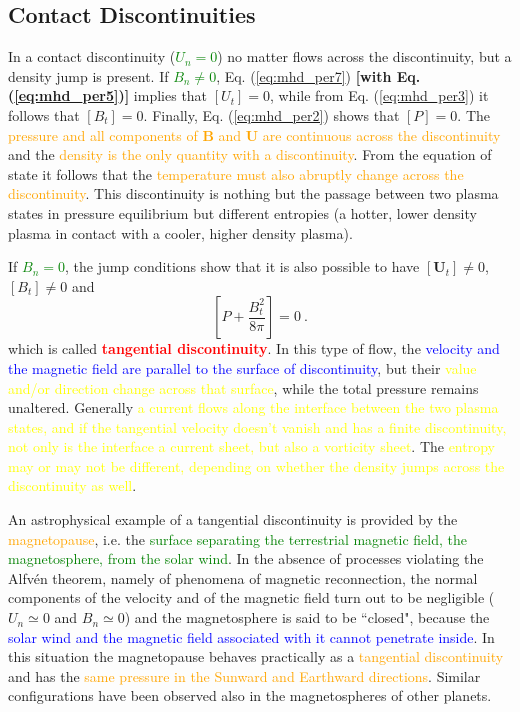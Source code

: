 \documentclass[12pt,a4paper]{article}
\renewcommand{\vec}[1]{\boldsymbol{#1}}
\begin{document}
\subsection{Contact Discontinuities}
\cite{2015bps..book.....C} In a contact discontinuity (\textcolor{green}{$U_n = 0$}) no matter flows across the discontinuity, but a density jump is present. If \textcolor{green}{$B_n \neq 0$}, Eq. (\ref{eq:mhd_per7}) {\bf[with Eq. (\ref{eq:mhd_per5})]} implies that $[U_t] = 0$, while from Eq. (\ref{eq:mhd_per3}) it follows that $[B_t] = 0$. Finally, Eq. (\ref{eq:mhd_per2}) shows that $[P] = 0$. The \textcolor{orange}{pressure and all components of $\vec{B}$ and $\vec{U}$ are continuous across the discontinuity} and the \textcolor{orange}{density is the only quantity with a discontinuity}. From the equation of state it follows that the \textcolor{orange}{temperature must also abruptly change across the discontinuity}. This discontinuity is nothing but the passage between two plasma states in pressure equilibrium but different entropies (a hotter, lower density plasma in contact with a cooler, higher density plasma). 

If \textcolor{green}{$B_n = 0$}, the jump conditions show that it is also possible to have $[\vec{U}_t] \neq 0$, $[B_t] \neq 0$ and
\begin{equation*}
\left[P +\frac{B_t^2}{8\pi} \right] = 0 ~.
\end{equation*}
which is called \textcolor{red}{\bf tangential discontinuity}. In this type of flow, the \textcolor{blue}{velocity and the magnetic field are parallel to the surface of discontinuity}, but their \textcolor{yellow}{value and/or direction change across that surface}, while the total pressure remains unaltered. Generally \textcolor{yellow}{a current flows along the interface between the two plasma states, and if the tangential velocity doesn't vanish and has a finite discontinuity, not only is the interface a current sheet, but also a vorticity sheet}. The \textcolor{yellow}{entropy may or may not be different, depending on whether the density jumps across the discontinuity as well}.

An astrophysical example of a tangential discontinuity is provided by the \textcolor{orange}{magnetopause}, i.e. the \textcolor{green}{surface separating the terrestrial magnetic field, the magnetosphere, from the solar wind}. In the absence of processes violating the Alfv\'en theorem, namely of phenomena of magnetic reconnection, the normal components of the velocity and of the magnetic field turn out to be negligible ($U_n \simeq 0$ and $B_n \simeq 0$) and the magnetosphere is said to be ``closed", because the \textcolor{blue}{solar wind and the magnetic field associated with it cannot penetrate inside}. In this situation the magnetopause behaves practically as a \textcolor{orange}{tangential discontinuity} and has the \textcolor{orange}{same pressure in the Sunward and Earthward directions}. Similar configurations have been observed also in the magnetospheres of other planets.
\end{document}
